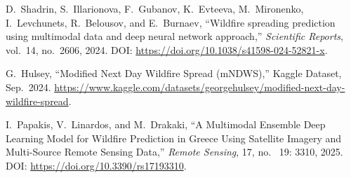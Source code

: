 \documentclass[conference]{IEEEtran}
\begin{document}
\begin{thebibliography}{00}
D.~Shadrin, S.~Illarionova, F.~Gubanov, K.~Evteeva, M.~Mironenko, I.~Levchunets, R.~Belousov, and E.~Burnaev, ``Wildfire spreading prediction using multimodal data and deep neural network approach,'' \emph{Scientific Reports}, vol.~14, no.~2606, 2024. DOI: \url{https://doi.org/10.1038/s41598-024-52821-x}.

G.~Hulsey, ``Modified Next Day Wildfire Spread (mNDWS),'' Kaggle Dataset, Sep.~2024. \url{https://www.kaggle.com/datasets/georgehulsey/modified-next-day-wildfire-spread}.

I.~Papakis, V.~Linardos, and M.~Drakaki, ``A Multimodal Ensemble Deep Learning Model for Wildfire Prediction in Greece Using Satellite Imagery and Multi-Source Remote Sensing Data,''
\emph{Remote Sensing}, 17, no.~ 19: 3310,  2025. DOI: \url{https://doi.org/10.3390/rs17193310}.

\end{thebibliography}
\end{document}
